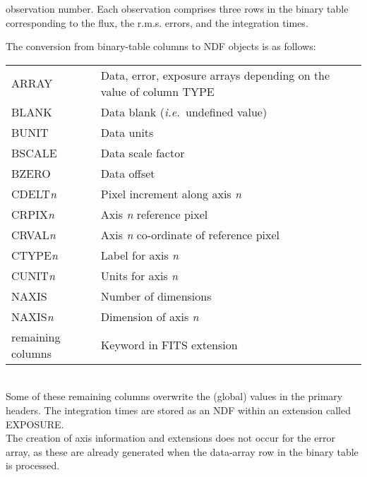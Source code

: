 \documentclass[twoside,11pt]{article}
\newcommand{\sstitem}{\item}
\newcommand{\sstitem}{\item}
\begin{document}
{{{{            observation number.
            Each observation comprises three rows in the binary table
            corresponding to the flux, the r.m.s. errors, and the integration
            times.
            \sstitem
            The conversion from binary-table columns to NDF objects is as
            follows:
            \\[\medskipamount]
            \begin{tabular}{lp{90mm}}
            ARRAY              &   Data, error, exposure arrays depending
                                   on the value of column TYPE \\
            BLANK              &   Data blank (\textit{i.e.}\ undefined value) \\
            BUNIT              &   Data units \\
            BSCALE             &   Data scale factor \\
            BZERO              &   Data offset \\
            CDELT\textit{n}           &   
             Pixel increment along axis \textit{n} \\
            CRPIX\textit{n}           &   Axis \textit{n} reference pixel \\
            CRVAL\textit{n}           &   
             Axis \textit{n} co-ordinate of reference pixel \\
            CTYPE\textit{n}           &   Label for axis \textit{n} \\
            CUNIT\textit{n}           &   Units for axis \textit{n} \\
            NAXIS              &   Number of dimensions \\
            NAXIS\textit{n}           &   Dimension of axis \textit{n} \\
            remaining columns  &   Keyword in FITS extension \\
            \end{tabular}
            \\[\medskipamount]
            Some of these remaining columns overwrite the (global) values
            in the primary headers.  The integration times are stored as
            an NDF within an extension called EXPOSURE.
            \\[\medskipamount]
            The creation of axis information and extensions does not occur
            for the error array, as these are already generated when the
            data-array row in the binary table is processed.
}}}}
\end{document}
